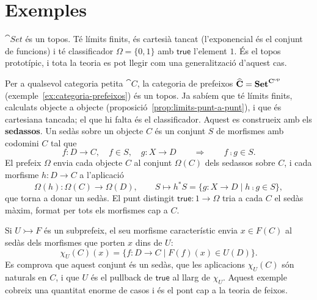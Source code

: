\section{Exemples}

\begin{exemple}[Conjunts]
$\cat{Set}$ és un topos. Té límits finits, és cartesià tancat (l'exponencial és el conjunt de funcions) i té classificador $\Omega=\{0,1\}$ amb $\mathsf{true}$ l'element $1$. És el topos prototípic, i tota la teoria es pot llegir com una generalització d'aquest cas.
\end{exemple}

\begin{exemple}[Prefeixos]
Per a qualsevol categoria petita $\cat{C}$, la categoria de prefeixos $\widehat{\mathbf{C}}=\mathbf{Set}^{\mathbf{C}^{\mathrm{op}}}$ (exemple~\ref{ex:categoria-prefeixos}) és un topos. Ja sabíem que té límits finits, calculats objecte a objecte (proposició~\ref{prop:limits-punt-a-punt}), i que és cartesiana tancada; el que hi falta és el classificador. Aquest es construeix amb els \textbf{sedassos}. Un sedàs sobre un objecte $C$ és un conjunt $S$ de morfismes amb codomini $C$ tal que
\[
f\colon D\to C,\quad f\in S,\quad g\colon X\to D
\qquad\Longrightarrow\qquad
f\comp g\in S.
\]
El prefeix $\Omega$ envia cada objecte $C$ al conjunt $\Omega(C)$ dels sedassos sobre $C$, i cada morfisme $h\colon D\to C$ a l'aplicació
\[
\Omega(h)\colon\Omega(C)\to\Omega(D),
\qquad
S\longmapsto h^{*}S=\{g\colon X\to D\mid h\comp g\in S\},
\]
que torna a donar un sedàs. El punt distingit $\mathsf{true}\colon 1\to\Omega$ tria a cada $C$ el sedàs màxim, format per tots els morfismes cap a $C$.

Si $U\rightarrowtail F$ és un subprefeix, el seu morfisme característic envia $x\in F(C)$ al sedàs dels morfismes que porten $x$ dins de $U$:
\[
\chi_U(C)(x)=\{f\colon D\to C\mid F(f)(x)\in U(D)\}.
\]
Es comprova que aquest conjunt és un sedàs, que les aplicacions $\chi_U(C)$ són naturals en $C$, i que $U$ és el pullback de $\mathsf{true}$ al llarg de $\chi_U$. Aquest exemple cobreix una quantitat enorme de casos i és el pont cap a la teoria de feixos.
\end{exemple}

